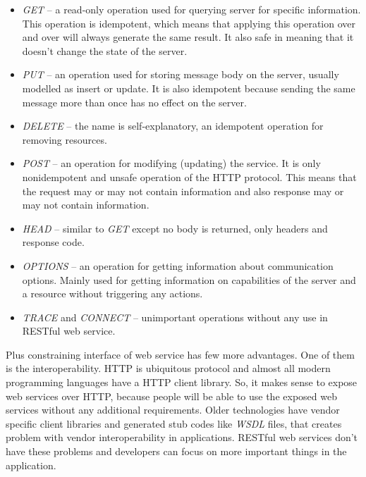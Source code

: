 \documentclass[12pt,final,oneside]{fithesis2}
\begin{document}
\begin{itemize}
\item
\textit{GET} -- a read-only operation used for querying server for specific information. This operation is idempotent, which means that applying this operation over and over will always generate the same result. It also safe in meaning that it doesn't change the state of the server.

\item
\textit{PUT} -- an operation used for storing message body on the server, usually modelled as insert or update. It is also idempotent because sending the same message more than once has no effect on the server.

\item
\textit{DELETE} -- the name is self-explanatory, an idempotent operation for removing resources.

\item
\textit{POST} -- an operation for modifying (updating) the service. It is only nonidempotent and unsafe operation of the HTTP protocol. This means that the request may or may not contain information and also response may or may not contain information.

\item
\textit{HEAD} -- similar to \textit{GET} except no body is returned, only headers and response code.

\item
\textit{OPTIONS} -- an operation for getting information about communication options. Mainly used for getting information on capabilities of the server and a resource without triggering any actions.

\item
\textit{TRACE} and \textit{CONNECT} -- unimportant operations without any use in RESTful web service.
\end{itemize}

Plus constraining interface of web service has few more advantages. One of them is the interoperability. HTTP is ubiquitous protocol and almost all modern programming languages have a HTTP client library. So, it makes sense to expose web services over HTTP, because people will be able to use the exposed web services without any additional requirements. Older technologies have vendor specific client libraries and generated stub codes like \textit{WSDL} files, that creates problem with vendor interoperability in applications. RESTful web services don't have these problems and developers can focus on more important things in the application.
\end{document}
